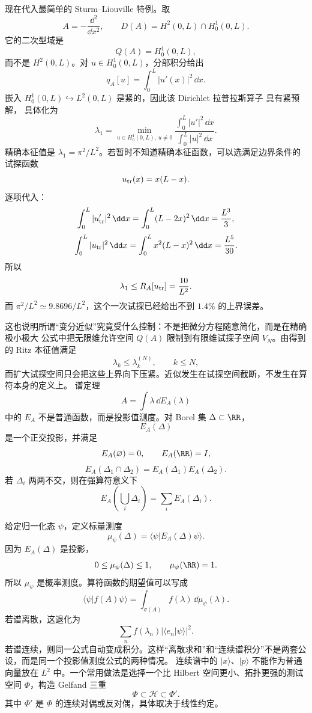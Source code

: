 现在代入最简单的 Sturm--Liouville 特例。取
\[
A=-\frac{\dd^2}{\dd x^2},
\qquad
D(A)=H^2(0,L)\cap H_0^1(0,L).
\]
它的二次型域是
\[
Q(A)=H_0^1(0,L),
\]
而不是 $H^2(0,L)$。对 $u\in H_0^1(0,L)$，分部积分给出
\[
q_A[u]=\int_0^L|u'(x)|^2\,\dd x.
\]
嵌入 $H_0^1(0,L)\hookrightarrow L^2(0,L)$ 是紧的，因此该 Dirichlet 拉普拉斯算子 具有紧预解， 具体化为
\begin{equation*}{
\lambda_1=
\min_{u\in H_0^1(0,L),\,u\ne0}
\frac{\int_0^L|u'|^2\,\dd x}{\int_0^L|u|^2\,\dd x}
}.\end{equation*}
精确本征值是 $\lambda_1=\pi^2/L^2$。若暂时不知道精确本征函数，可以选满足边界条件的试探函数
\[
u_{\rm tr}(x)=x(L-x).
\]
逐项代入：
\[
\int_0^L|u_{\rm tr}'|^2\,\dd x
=\int_0^L(L-2x)^2\,\dd x
=\frac{L^3}{3},
\]
\[
\int_0^L|u_{\rm tr}|^2\,\dd x
=\int_0^Lx^2(L-x)^2\,\dd x
=\frac{L^5}{30}.
\]
所以
\begin{equation*}{
\lambda_1\le R_A[u_{\rm tr}]=\frac{10}{L^2}
}.\end{equation*}
而 $\pi^2/L^2\simeq9.8696/L^2$，这个一次试探已经给出不到 $1.4\%$ 的上界误差。

这也说明所谓“变分近似”究竟受什么控制：不是把微分方程随意简化，而是在精确 极小极大 公式中把无限维允许空间 $Q(A)$ 限制到有限维试探子空间 $V_N$。由得到的 Ritz 本征值满足
\[
\lambda_k\le\lambda_k^{(N)},
\qquad k\le N,
\]
而扩大试探空间只会把这些上界向下压紧。近似发生在试探空间截断，不发生在算符本身的定义上。
谱定理
\[
A=\int\lambda\,\dd E_A(\lambda)
\]
中的 $E_A$ 不是普通函数，而是投影值测度。对 Borel 集 $\Delta\subset\RR$，
\[
E_A(\Delta)
\]
是一个正交投影，并满足
\[
E_A(\varnothing)=0,
\qquad
E_A(\RR)=I,
\]
\[
E_A(\Delta_1\cap\Delta_2)
=E_A(\Delta_1)E_A(\Delta_2).
\]
若 $\Delta_i$ 两两不交，则在强算符意义下
\[
E_A\left(\bigcup_i\Delta_i\right)
=\sum_iE_A(\Delta_i).
\]

给定归一化态 $\psi$，定义标量测度
\[
\mu_\psi(\Delta)
=\langle\psi|E_A(\Delta)\psi\rangle.
\]
因为 $E_A(\Delta)$ 是投影，
\[
0\le\mu_\psi(\Delta)\le1,
\qquad
\mu_\psi(\RR)=1.
\]
所以 $\mu_\psi$ 是概率测度。算符函数的期望值可以写成
\begin{equation*}{
\langle\psi|f(A)\psi\rangle
=\int_{\sigma(A)}f(\lambda)\,\dd\mu_\psi(\lambda)
}.\end{equation*}
若谱离散，这退化为
\[
\sum_n f(\lambda_n)|\langle e_n|\psi\rangle|^2.
\]
若谱连续，则同一公式自动变成积分。这样“离散求和”和“连续谱积分”不是两套公设，而是同一个投影值测度公式的两种情况。
连续谱中的 $|x\rangle$、$|p\rangle$ 不能作为普通向量放在 $L^2$ 中。一个常用做法是选择一个比 Hilbert 空间更小、拓扑更强的测试空间 $\Phi$，构造 Gelfand 三重
\begin{equation*}{
\Phi\subset\mathcal H\subset\Phi'
}.\end{equation*}
其中 $\Phi'$ 是 $\Phi$ 的连续对偶或反对偶，具体取决于线性约定。

